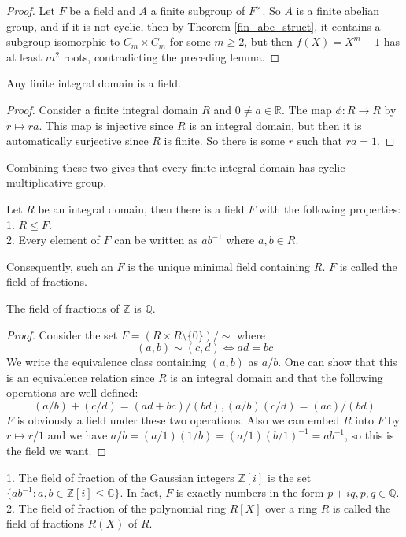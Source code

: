 \begin{proof}
    Let $F$ be a field and $A$ a finite subgroup of $F^\times$.
    So $A$ is a finite abelian group, and if it is not cyclic, then by Theorem \ref{fin_abe_struct}, it contains a subgroup isomorphic to $C_m\times C_m$ for some $m\ge 2$, but then $f(X)=X^m-1$ has at least $m^2$ roots, contradicting the preceding lemma.
\end{proof}
\begin{proposition}
    Any finite integral domain is a field.
\end{proposition}
\begin{proof}
    Consider a finite integral domain $R$ and $0\neq a\in\mathbb R$.
    The map $\phi:R\to R$ by $r\mapsto ra$.
    This map is injective since $R$ is an integral domain, but then it is automatically surjective since $R$ is finite.
    So there is some $r$ such that $ra=1$.
\end{proof}
Combining these two gives that every finite integral domain has cyclic multiplicative group.
\begin{theorem}
    Let $R$ be an integral domain, then there is a field $F$ with the following properties:\\
    1. $R\le F$.\\
    2. Every element of $F$ can be written as $ab^{-1}$ where $a,b\in R$.
\end{theorem}
Consequently, such an $F$ is the unique minimal field containing $R$.
$F$ is called the field of fractions.
\begin{example}
    The field of fractions of $\mathbb Z$ is $\mathbb Q$.
\end{example}
\begin{proof}
    Consider the set $F=(R\times R\setminus\{0\})/\sim$ where
    $$(a,b)\sim (c,d)\iff ad=bc$$
    We write the equivalence class containing $(a,b)$ as $a/b$.
    One can show that this is an equivalence relation since $R$ is an integral domain and that the following operations are well-defined:
    $$(a/b)+(c/d)=(ad+bc)/(bd),(a/b)(c/d)=(ac)/(bd)$$
    $F$ is obviously a field under these two operations.
    Also we can embed $R$ into $F$ by $r\mapsto r/1$ and we have $a/b=(a/1)(1/b)=(a/1)(b/1)^{-1}=ab^{-1}$, so this is the field we want.
\end{proof}
\begin{example}
    1. The field of fraction of the Gaussian integers $\mathbb Z[i]$ is the set $\{ab^{-1}:a,b\in\mathbb Z[i]\le\mathbb C\}$.
    In fact, $F$ is exactly numbers in the form $p+iq,p,q\in\mathbb Q$.\\
    2. The field of fraction of the polynomial ring $R[X]$ over a ring $R$ is called the field of fractions $R(X)$ of $R$.
\end{example}
